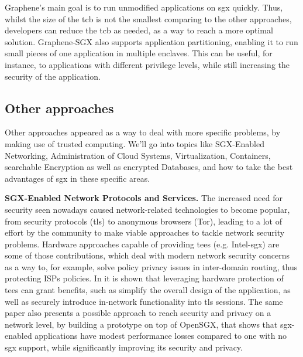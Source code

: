 Graphene's main goal is to run unmodified applications on \gls{sgx} quickly. Thus, whilst the size of the \gls{tcb} is not the smallest comparing to the other approaches, developers can reduce the \gls{tcb} as needed, as a way to reach a more optimal solution. 
Graphene-SGX also supports application partitioning, enabling it to run small pieces of one application in multiple enclaves. This can be useful, for instance, to applications with different privilege levels, while still increasing the security of the application.
\subsection{Other approaches}
\label{ssec:otherSGXFrameworks}



Other approaches appeared as a way to deal with more specific problems, by making use of trusted computing. We'll go into topics like SGX-Enabled Networking, Administration of Cloud Systems, Virtualization, Containers, searchable Encryption as well as encrypted Databases, and how to take the best advantages of \gls{sgx} in these specific areas. \newline


\textbf{SGX-Enabled Network Protocols and Services.} 
The increased need for security seen nowadays caused network-related technologies to become popular, from security protocols (\gls{tls}) to anonymous browsers (Tor), leading to a lot of effort by the community to make viable approaches to tackle network security problems. 
Hardware approaches capable of providing \gls{tee}s (e.g. Intel-\gls{sgx}) are some of those contributions, which deal with modern network security concerns as a way to, for example, solve policy privacy issues in inter-domain routing, thus protecting ISPs policies.
In \cite{torSGXPaper} it is shown that leveraging hardware protection of \gls{tee}s can grant benefits, such as simplify the overall design of the application, as well as securely introduce in-network functionality into \gls{tls} sessions. The same paper also presents a possible approach to reach security and privacy on a network level, by building a prototype on top of OpenSGX, that shows that \gls{sgx}-enabled applications have modest performance losses compared to one with no \gls{sgx} support, while significantly improving its security and privacy.

